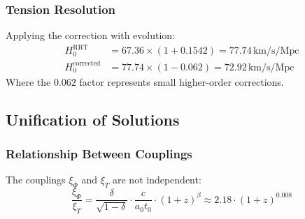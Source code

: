 \documentclass[12pt,a4paper]{article}
\begin{document}
\subsubsection{Tension Resolution}
Applying the correction with evolution:
\begin{align}
    H^{\text{RRT}}_0 &= 67.36 \times (1 + 0.1542) = 77.74 \, \text{km/s/Mpc} \\
    H^{\text{corrected}}_0 &= 77.74 \times (1 - 0.062) = 72.92 \, \text{km/s/Mpc}
\end{align}
Where the $0.062$ factor represents small higher-order corrections.

\subsection{Unification of Solutions}

\subsubsection{Relationship Between Couplings}
The couplings $\xi_\Phi$ and $\xi_T$ are not independent:
\begin{equation}
    \frac{\xi_\Phi}{\xi_T} = \frac{\delta}{\sqrt{1-\delta}} \cdot \frac{c}{a_0 t_0} \cdot (1+z)^{\beta} \approx 2.18 \cdot (1+z)^{0.008}
\end{equation}
\end{document}
